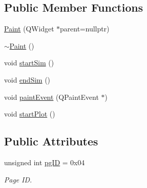 \subsection*{Public Member Functions}
\begin{DoxyCompactItemize}
\item 
\mbox{\hyperlink{classPaint_a3be358e4052f20b7342f17a37fc32c4e}{Paint}} (Q\+Widget $\ast$parent=nullptr)
\item 
\mbox{\hyperlink{classPaint_ad9e9b7084b28e84887c70d0e4540ddb8}{$\sim$\+Paint}} ()
\item 
void \mbox{\hyperlink{classPaint_a1f01fcd27e595cc9aacd1ef94e3e1454}{start\+Sim}} ()
\item 
void \mbox{\hyperlink{classPaint_a0624eaeb1d076ab01278b27026aba249}{end\+Sim}} ()
\item 
void \mbox{\hyperlink{classPaint_a93538df552b492f35b5349c9c546707f}{paint\+Event}} (Q\+Paint\+Event $\ast$)
\item 
void \mbox{\hyperlink{classPaint_ab8c4d8cbf3999cd2b80b299587ec9e83}{start\+Plot}} ()
\end{DoxyCompactItemize}
\subsection*{Public Attributes}
\begin{DoxyCompactItemize}
\item 
unsigned int \mbox{\hyperlink{classPaint_af6314388e667b01d9cd88e1d875d0449}{pg\+ID}} = 0x04
\begin{DoxyCompactList}\small\item\em Page ID. \end{DoxyCompactList}\end{DoxyCompactItemize}
